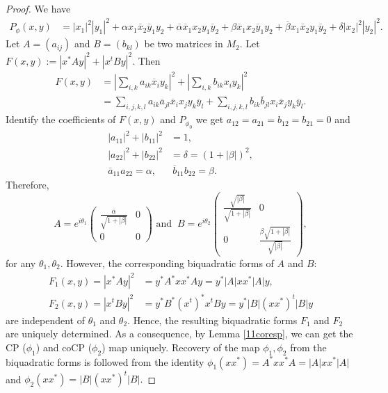 \documentclass[12pt,a4paper]{amsart}
\theoremstyle{plain}
\theoremstyle{remark}
\theoremstyle{definition}
\begin{document}
\begin{proof}
We have
\begin{align*}
P_{\phi}(x,y) & = |x_1|^2|y_1|^2 + \alpha x_1 \overline{x}_2 \overline{y}_1 y_2 + \overline{\alpha}  \overline{x}_1 x_2y_1\overline{y}_2 + \beta \overline{x}_1x_2 \overline{y}_1 y_2 + \overline{\beta}x_1 \overline{x}_2 y_1\overline{y}_2 + \delta |x_2|^2|y_2|^2.
\end{align*}
Let $A = (a_{ij})$ and $B=(b_{kl})$ be two matrices in $M_2.$ Let
$ F(x,y) := |x^*Ay|^2 + |x^tBy|^2. $
Then 
\begin{align*}
F(x,y) & = \left|{\sum_{i,k}a_{ik}\overline{x}_i y_k}\right|^2 + \left|{\sum_{i,k}b_{ik}{x}_i y_k}\right|^2 \\
       & = \sum_{i,j,k,l} a_{ik}\overline{a}_{jl}\overline{x}_i x_j y_k \overline{y}_l +  \sum_{i,j,k,l} b_{ik}\overline{b}_{jl}{x}_i \overline{x}_j y_k \overline{y}_l.
\end{align*}
 Identify the coefficients of $F(x,y)$ and $P_{\phi_0}$ we get $a_{12} =a_{21} =b_{12}=b_{21} =0$ and 
 \begin{align*}
 	|a_{11}|^2+|b_{11}|^2 & =1,\\
 	|a_{22}|^2+|b_{22}|^2 & = \delta  = (1+|\beta|)^2 ,\\
 	\overline{a}_{11}a_{22} = \alpha, \ & \  \overline{b}_{11} b_{22} =\beta.
 \end{align*}
Therefore, 
$$
A = e^{i\theta_1} \left(\begin{array}{ll}
	\frac{\overline{\alpha}}{\sqrt{1+|\beta|}} & 0 \\
	0 & 0 
  \end{array} \right) \textrm{  and  }\ 
B = e^{i\theta_2} \left(\begin{array}{ll}
	\frac{\sqrt{|\beta|}}{\sqrt{1+|\beta|}} & 0 \\
	0 & \frac{\beta \sqrt{1+|\beta|}}{\sqrt{|\beta|}}
 \end{array} \right) ,
$$
for any $\theta_1, \theta_2.$ However, the corresponding biquadratic forms of $A$ and $B$: 
\begin{align*}
F_1(x,y)=|x^*Ay|^2 & = y^*A^*xx^*Ay = y^*|A|xx^*|A|y, \\
F_2(x,y)=|x^tBy|^2 & = y^*B^*(x^t)^*x^tBy = y^*|B|(xx^*)^t|B|y
\end{align*} 
are independent of $\theta_1$ and $\theta_2.$ Hence, the resulting biquadratic forms $F_1$ and $F_2$ are uniquely determined. As a consequence, by Lemma \ref{11coresp}, we can get the CP ($\phi_1$) and coCP ($\phi_2$) map uniquely. Recovery of the map $\phi_1,\phi_2$ from the biquadratic forms is followed from the identity $\phi_1(xx^*) = A^*xx^*A=  |A| xx^* |A| $ and $\phi_2(xx^*) = |B|(xx^*)^t|B|.$
\end{proof}
\end{document}
